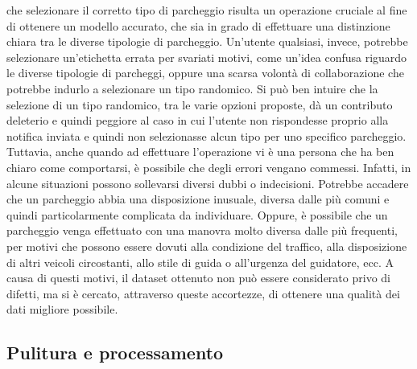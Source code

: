 che selezionare il corretto tipo di parcheggio risulta un operazione cruciale al fine di ottenere
un modello accurato, che sia in grado di effettuare una distinzione chiara tra le diverse tipologie
di parcheggio. Un'utente qualsiasi, invece, potrebbe selezionare un'etichetta errata per svariati
motivi, come un'idea confusa riguardo le diverse tipologie di parcheggi, oppure una scarsa volontà
di collaborazione che potrebbe indurlo a selezionare un tipo randomico. Si può ben intuire che la
selezione di un tipo randomico, tra le varie opzioni proposte, dà un contributo deleterio e quindi
peggiore al caso in cui l'utente non rispondesse proprio alla notifica inviata e quindi non selezionasse
alcun tipo per uno specifico parcheggio. Tuttavia, anche quando ad effettuare l'operazione vi è una
persona che ha ben chiaro come comportarsi, è possibile che degli errori vengano commessi. Infatti,
in alcune situazioni possono sollevarsi diversi dubbi o indecisioni. Potrebbe accadere che un parcheggio
abbia una disposizione inusuale, diversa dalle più comuni e quindi particolarmente complicata da
individuare. Oppure, è possibile che un parcheggio venga effettuato con una manovra molto diversa dalle
più frequenti, per motivi che possono essere dovuti alla condizione del traffico, alla disposizione di
altri veicoli circostanti, allo stile di guida o all'urgenza del guidatore, ecc. A causa di questi
motivi, il dataset ottenuto non può essere considerato privo di difetti, ma si è cercato, attraverso
queste accortezze, di ottenere una qualità dei dati \cite{data_quality_considerations} migliore possibile.\\

\subsection{Pulitura e processamento}

